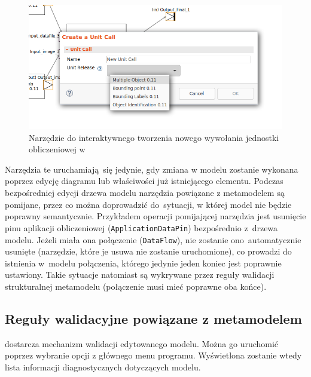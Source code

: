 \begin{figure}[!hb]
	\centering

	\includegraphics[width=0.95\linewidth]{./images/sirius-desktop-create-unit-call-tool.png}
	\caption{Narzędzie do interaktywnego tworzenia nowego wywołania jednostki
		obliczeniowej w~\SiriusDesktop{}}\label{rys:sirius-desktop-create-unit-call-tool}
\end{figure}

Narzędzia te uruchamiają się jedynie, gdy zmiana w modelu zostanie wykonana
poprzez edycję diagramu lub właściwości już istniejącego elementu. Podczas
bezpośredniej edycji drzewa modelu narzędzia powiązane z metamodelem są
pomijane, przez co można doprowadzić do~sytuacji, w której model nie będzie
poprawny
semantycznie. Przykładem operacji pomijającej narzędzia jest usunięcie pinu
aplikacji obliczeniowej (\texttt{ApplicationDataPin}) bezpośrednio z~drzewa
modelu. Jeżeli miała ona połączenie (\texttt{DataFlow}), nie zostanie
ono~automatycznie usunięte (narzędzie, które je usuwa nie zostanie
uruchomione), co
prowadzi do istnienia w~modelu połączenia, którego jedynie jeden koniec jest
poprawnie ustawiony. Takie sytuacje natomiast są wykrywane przez reguły
walidacji strukturalnej metamodelu (połączenie musi mieć poprawne oba końce).

\subsection{Reguły walidacyjne powiązane z
	metamodelem}\label{sec:reguly-walidacyjne-metamodel}

\SiriusDesktop{} dostarcza mechanizm walidacji edytowanego modelu. Można
go uruchomić poprzez wybranie opcji  z głównego menu
programu. Wyświetlona zostanie wtedy lista informacji diagnostycznych
dotyczących modelu.

